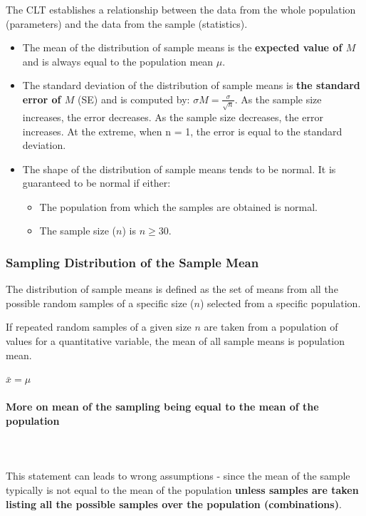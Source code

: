 \documentclass{article}
\begin{document}
The CLT establishes a relationship between the data from the whole population (parameters) and the data from the sample (statistics). 

\begin{itemize}
    \item The mean of the distribution of sample means is the \textbf{expected value of $M$} and is always equal to the population mean $\mu$.
    \item The standard deviation of the distribution of sample means is \textbf{the standard error of $M$} (SE) and is computed by: $\sigma{M} = \frac{\sigma}{\sqrt{n}}$. As the sample size increases, the error decreases.  As the sample size decreases, the error increases.  At the extreme, when n = 1, the error is equal to the standard deviation.
    \item The shape of the distribution of sample means tends to be normal. It is guaranteed to be normal if either: 
    \begin{itemize}
        \item The population from which the samples are obtained is normal.
        \item The sample size ($n$) is $n \geq 30$.
    \end{itemize}  
\end{itemize}

\subsubsection{Sampling Distribution of the Sample Mean}
The distribution of sample means is defined as the set of means from all the possible random samples of a specific size ($n$) selected from a specific population. 

If repeated random samples of a given size $n$ are taken from a population of values for a quantitative variable, the mean of all sample means is population mean.

$\bar{x} = \mu $

\paragraph{More on mean of the sampling being equal to the mean of the population}\mbox{} \\
\mbox{} \\
This statement can leads to wrong assumptions - since the mean of the sample typically is not equal to the mean of the population \textbf{unless samples are taken listing all the possible samples over the population (combinations)}.
\end{document}

